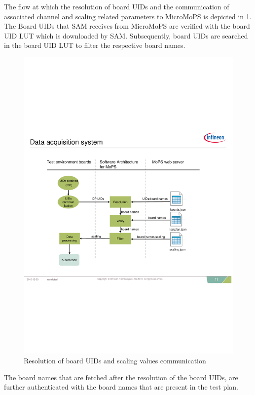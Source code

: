 The flow at which the resolution of board UIDs and the communication of associated channel and scaling related parameters to MicroMoPS is depicted in \cref{fig:resolution}. 
The Board UIDs that SAM receives from MicroMoPS are verified with the board UID \gls{LUT} which is downloaded by SAM. 
Subsequently, board UIDs are searched in the board UID \gls{LUT} to filter the respective board names. %
\begin{figure}[htp]
		\centering
		\includegraphics[trim=0 250 0 260, clip, width=160mm]{images/resolution.pdf}
		\caption{Resolution of board UIDs and scaling values communication}
		\label{fig:resolution}
\end{figure}
The board names that are fetched after the resolution of the board UIDs, are further authenticated with the board names that are present in the test plan. 
